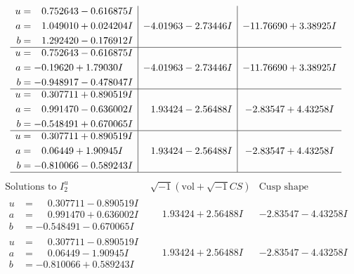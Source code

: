 \documentclass[1p]{elsarticle_modified}
\theoremstyle{definition}
\newcommand{\I}{\sqrt{-1}}
\begin{document}
$$\begin{array}{c|c|c}
\begin{aligned}
u &= \phantom{-}0.752643 - 0.616875 I \\
a &= \phantom{-}1.049010 + 0.024204 I \\
b &= \phantom{-}1.292420 - 0.176912 I\end{aligned}
 & -4.01963 - 2.73446 I & -11.76690 + 3.38925 I \\ \hline\begin{aligned}
u &= \phantom{-}0.752643 - 0.616875 I \\
a &= -0.19620 + 1.79030 I \\
b &= -0.948917 - 0.478047 I\end{aligned}
 & -4.01963 - 2.73446 I & -11.76690 + 3.38925 I \\ \hline\begin{aligned}
u &= \phantom{-}0.307711 + 0.890519 I \\
a &= \phantom{-}0.991470 - 0.636002 I \\
b &= -0.548491 + 0.670065 I\end{aligned}
 & \phantom{-}1.93424 - 2.56488 I & -2.83547 + 4.43258 I \\ \hline\begin{aligned}
u &= \phantom{-}0.307711 + 0.890519 I \\
a &= \phantom{-}0.06449 + 1.90945 I \\
b &= -0.810066 - 0.589243 I\end{aligned}
 & \phantom{-}1.93424 - 2.56488 I & -2.83547 + 4.43258 I\\
 \hline 
 \end{array}$$\newpage$$\begin{array}{c|c|c}  
\text{Solutions to }I^u_{2}& \I (\text{vol} + \sqrt{-1}CS) & \text{Cusp shape}\\
 \hline 
\begin{aligned}
u &= \phantom{-}0.307711 - 0.890519 I \\
a &= \phantom{-}0.991470 + 0.636002 I \\
b &= -0.548491 - 0.670065 I\end{aligned}
 & \phantom{-}1.93424 + 2.56488 I & -2.83547 - 4.43258 I \\ \hline\begin{aligned}
u &= \phantom{-}0.307711 - 0.890519 I \\
a &= \phantom{-}0.06449 - 1.90945 I \\
b &= -0.810066 + 0.589243 I\end{aligned}
 & \phantom{-}1.93424 + 2.56488 I & -2.83547 - 4.43258 I \\ \hline\begin{aligned}

\end{aligned}
\end{array}$$
\end{document}
